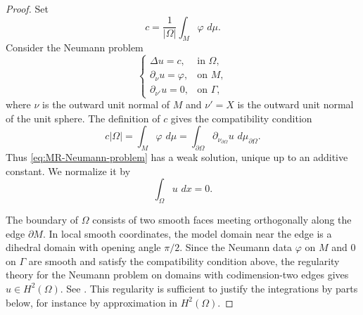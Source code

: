\documentclass[11pt, reqno]{amsart}
\theoremstyle{remark}
\theoremstyle{definition}
\numberwithin{equation}{section}
\newcommand{\dd}{\,d}
\begin{document}
\begin{proof}
Set
\begin{equation*}
    c=\frac{1}{|\Omega|}\int_M\varphi\,\dd\mu.
\end{equation*}
Consider the Neumann problem
\begin{equation}\label{eq:MR-Neumann-problem}
    \begin{cases}
        \Delta u=c, & \text{in }\Omega,\\
        \partial_\nu u=\varphi, & \text{on }M,\\
        \partial_{\nu'}u=0, & \text{on }\Gamma,
    \end{cases}
\end{equation}
where $\nu$ is the outward unit normal of $M$ and
$\nu'=X$ is the outward unit normal of the unit sphere.
The definition of $c$ gives the compatibility condition
\begin{equation*}
    c|\Omega|
    =
    \int_M\varphi\,\dd\mu
    =
    \int_{\partial\Omega}\partial_{\nu_{\partial\Omega}}u
    \,\dd\mu_{\partial\Omega}.
\end{equation*}
Thus \eqref{eq:MR-Neumann-problem} has a weak solution, unique up
to an additive constant. We normalize it by
\begin{equation*}
    \int_\Omega u\,\dd x=0.
\end{equation*}

The boundary of $\Omega$ consists of two smooth faces meeting
orthogonally along the edge $\partial M$. In
local smooth coordinates, the model domain near the edge is a
dihedral domain with opening angle $\pi/2$. Since the Neumann
data $\varphi$ on $M$ and $0$ on $\Gamma$ are smooth and satisfy
the compatibility condition above, the regularity theory for the
Neumann problem on domains with codimension-two edges gives $u\in H^2(\Omega)$. 
See \cite[Section~23.C, Theorem~23.3, and
Example~23.11(1), pp.~196--198]{Dauge1988}.
This regularity is sufficient to justify the integrations by
parts below, for instance by approximation in $H^2(\Omega)$.


\end{proof}
\end{document}

